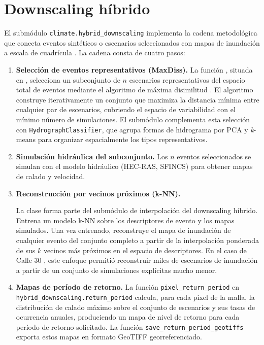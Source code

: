 \section{Downscaling híbrido}

El submódulo \texttt{climate.hybrid\_downscaling} implementa la cadena metodológica que conecta eventos sintéticos o escenarios seleccionados con mapas de inundación a escala de cuadrícula \parencite{navas2019mallorca,navas2024calle30}. La cadena consta de cuatro pasos:

\begin{enumerate}
  \item \textbf{Selección de eventos representativos (MaxDiss).} La función , situada en , selecciona un subconjunto de $n$ escenarios representativos del espacio total de eventos mediante el algoritmo de máxima disimilitud \parencite{camus2011maxdiss}. El algoritmo construye iterativamente un conjunto que maximiza la distancia mínima entre cualquier par de escenarios, cubriendo el espacio de variabilidad con el mínimo número de simulaciones. El submódulo  complementa esta selección con \texttt{HydrographClassifier}, que agrupa formas de hidrograma por PCA y \emph{k}-means para organizar espacialmente los tipos representativos.

  \item \textbf{Simulación hidráulica del subconjunto.} Los $n$ eventos seleccionados se simulan con el modelo hidráulico (HEC-RAS, SFINCS) para obtener mapas de calado y velocidad.

  \item \textbf{Reconstrucción por vecinos próximos (k-NN).}\par
  La clase  forma parte del submódulo de interpolación del downscaling híbrido. Entrena un modelo k-NN sobre los descriptores de evento y los mapas simulados. Una vez entrenado, reconstruye el mapa de inundación de cualquier evento del conjunto completo a partir de la interpolación ponderada de sus $k$ vecinos más próximos en el espacio de descriptores. En el caso de Calle 30 \parencite{navas2024calle30}, este enfoque permitió reconstruir miles de escenarios de inundación a partir de un conjunto de simulaciones explícitas mucho menor.

  \item \textbf{Mapas de período de retorno.} La función \texttt{pixel\_return\_period} en \texttt{hybrid\_downscaling.return\_period} calcula, para cada pixel de la malla, la distribución de calado máximo sobre el conjunto de escenarios y sus tasas de ocurrencia anuales, produciendo un mapa de nivel de retorno para cada período de retorno solicitado. La función \texttt{save\_return\_period\_geotiffs} exporta estos mapas en formato GeoTIFF georreferenciado.
\end{enumerate}

